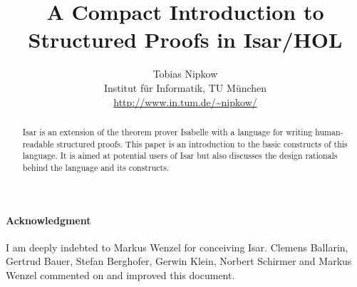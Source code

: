 \documentclass[11pt,a4paper]{article}
\begin{document}
\title{A Compact Introduction to Structured Proofs in Isar/HOL}
\author{Tobias Nipkow\\Institut f{\"u}r Informatik, TU M{\"u}nchen\\
 {\small\url{http://www.in.tum.de/~nipkow/}}}
\date{}
\maketitle

\begin{abstract}
  Isar is an extension of the theorem prover Isabelle with a language
  for writing human-readable structured proofs. This paper is an
  introduction to the basic constructs of this language. It is aimed
  at potential users of Isar but also discusses the design rationals
  behind the language and its constructs.
\end{abstract}





%


{\small
\paragraph{Acknowledgment}
I am deeply indebted to Markus Wenzel for conceiving Isar. Clemens Ballarin,
Gertrud Bauer, Stefan Berghofer, Gerwin Klein, Norbert Schirmer and
Markus Wenzel commented on and improved this document.
}

\begingroup
 \small\raggedright\frenchspacing

\endgroup
\end{document}
